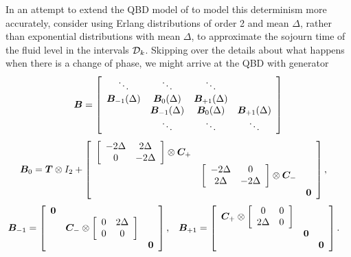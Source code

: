 In an attempt to extend the QBD model of \cite{bo2013} to model this determinism more accurately, consider using Erlang distributions of order 2 and mean \(\Delta\), rather than exponential distributions with mean \(\Delta\), to approximate the sojourn time of the fluid level in the intervals \(\mathcal{D}_k\). Skipping over the details about what happens when there is a change of phase, we might arrive at the QBD with generator 
\[\boldsymbol B = \left[ \begin{array}{cccc} \ddots & \ddots & \ddots & \\ \boldsymbol B_{-1}(\Delta) & \boldsymbol B_0(\Delta) & \boldsymbol B_{+1}(\Delta) & \\  & \boldsymbol B_{-1}(\Delta) & \boldsymbol B_0(\Delta) & \boldsymbol B_{+1}(\Delta) \\ & \ddots & \ddots & \ddots \end{array} \right]\]
\begin{align}\label{eqn:asdggg}
\boldsymbol B_0 &= \boldsymbol T\otimes I_2 + \left[ \begin{array}{ccc} \left[\begin{array}{cc} -2\Delta & 2\Delta \\ 0 & -2\Delta \end{array}\right] \otimes \boldsymbol C_+ & & \\ & \left[\begin{array}{cc} -2\Delta & 0 \\ 2\Delta & -2\Delta \end{array}\right] \otimes \boldsymbol C_- & \\ & & \boldsymbol 0 \end{array}\right], 
\end{align}
\begin{align}\label{eqn:llleddii}
\boldsymbol B_{-1} &= \left[\begin{array}{ccc} \boldsymbol 0 & & \\ & \boldsymbol C_-\otimes \left[\begin{array}{cc} 0 & 2\Delta \\ 0 & 0 \end{array}\right] & \\ & & \boldsymbol 0 \end{array}\right],
&&\boldsymbol B_{+1} = \left[\begin{array}{ccc} \boldsymbol C_+\otimes \left[\begin{array}{cc} 0 & 0 \\ 2\Delta & 0 \end{array}\right] & & \\ & \boldsymbol 0 & \\ & & \boldsymbol 0\end{array}\right].
\end{align}
